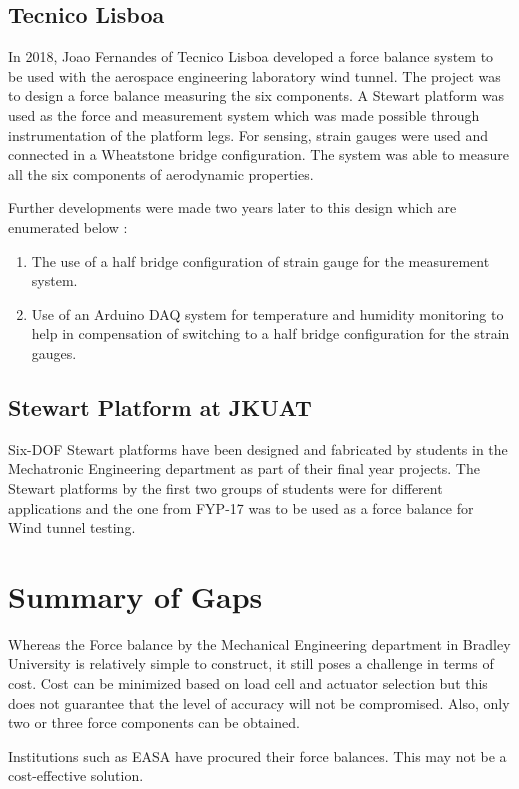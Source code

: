 \subsection{Tecnico Lisboa}
In 2018, Joao Fernandes of Tecnico Lisboa developed a force balance system to
be used with the aerospace engineering laboratory wind tunnel. The project was to
design a force balance measuring the six components. A Stewart platform was used as the
force and measurement system which was made possible through instrumentation of the platform legs.
For sensing, strain gauges were used and connected in a Wheatstone bridge configuration.
The system was able to measure all the six components of aerodynamic properties\cite{ferreira2015design}.

Further developments were made two years later to this design which are enumerated below \cite{ferreira2015design}:
\begin{enumerate}
\item The use of a half bridge configuration of strain gauge for the measurement system.
\item Use of an Arduino DAQ system for temperature and humidity monitoring to help in
compensation of switching to a half bridge configuration for the strain gauges.
\end{enumerate}
\subsection{Stewart Platform at JKUAT}
Six-DOF Stewart platforms have been designed and fabricated by students in the Mechatronic Engineering department as part of their final year projects. The Stewart platforms by the first two groups of students were for different applications and the one from FYP-17 was to be used as a force balance for Wind tunnel testing. 
\section{Summary of Gaps}
Whereas the Force balance by the Mechanical Engineering department in Bradley University is relatively simple to construct, it still poses a challenge in terms of cost. Cost can be minimized based on load cell and actuator selection but this does not guarantee that the level of accuracy will not be compromised. Also, only two or three force components can be obtained.

Institutions such as EASA have procured their force balances. This may not be a cost-effective solution.

